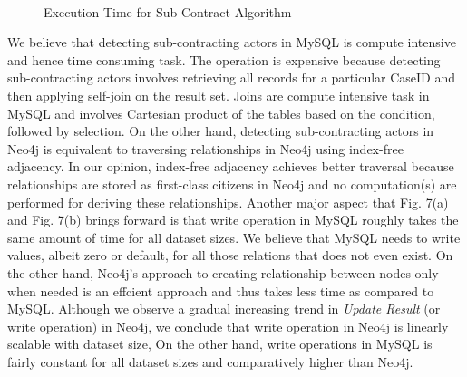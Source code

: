 \documentclass[11pt]{article}
\begin{document}
{{%


\begin{figure}
  \centering
  \mbox{
    \quad
    }
  \caption{Execution Time for Sub-Contract Algorithm}
\end{figure}
\par{ We believe that detecting sub-contracting actors in MySQL is compute intensive and hence time consuming task. The operation is expensive because detecting sub-contracting actors involves retrieving all records for a particular CaseID and then applying self-join on the result set. Joins are compute intensive task in MySQL and involves Cartesian product of the tables based on the condition, followed by selection. On the other hand, detecting sub-contracting actors in Neo4j is equivalent to traversing relationships in Neo4j using index-free adjacency. In our opinion, index-free adjacency achieves better traversal because relationships are stored as first-class citizens in Neo4j and no computation(s) are performed for deriving these relationships. Another major aspect that Fig. 7(a) and Fig. 7(b) brings forward is that write operation in MySQL roughly takes the same amount of time for all dataset sizes. We believe that MySQL needs to write values, albeit zero or default, for all those relations that does not even exist. On the other hand, Neo4j's approach to creating relationship between nodes only when needed is an effcient approach and thus takes less time as compared to MySQL. Although we observe a gradual increasing trend in \textit{Update Result} (or write operation) in Neo4j, we conclude that write operation in Neo4j is linearly scalable with dataset size, On the other hand, write operations in MySQL is fairly constant for all dataset sizes and comparatively higher than Neo4j.}
\renewcommand{\arraystretch}{.5}
}}
\end{document}
